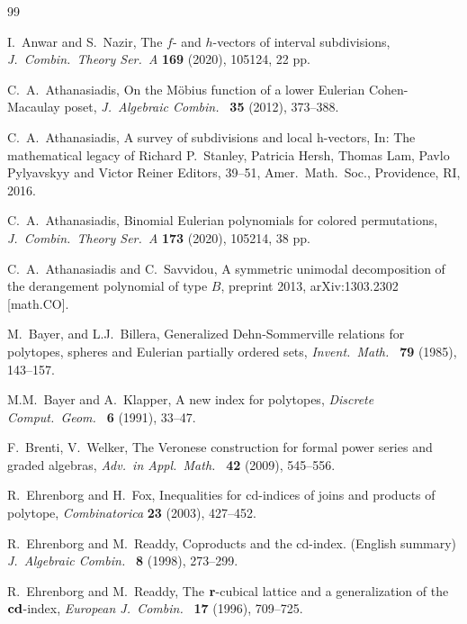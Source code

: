 \documentclass[reqno,12pt]{amsart}
\numberwithin{equation}{section}
\newcommand{\0}{\widehat{0}}
\newcommand{\1}{\widehat{1}}
\newcommand{\2}{\widehat{2}}
\begin{document}
\begin{thebibliography}{99}

I.\ Anwar and S.\ Nazir, 
The $f$- and $h$-vectors of interval subdivisions,
{\it J.\ Combin.\ Theory Ser.\ A } {\bf 169} (2020), 105124, 22 pp.   
  
C.\ A.\ Athanasiadis, 
On the M\"obius function of a lower Eulerian Cohen-Macaulay poset,
{\it J.\ Algebraic Combin.\ } {\bf 35} (2012), 373--388. 

C.\ A.\ Athanasiadis, 
A survey of subdivisions and local h-vectors, In: The mathematical
legacy of Richard P.\ Stanley, Patricia Hersh, Thomas Lam, Pavlo
Pylyavskyy and Victor Reiner Editors, 39--51, Amer.\ Math.\ Soc.,
Providence, RI, 2016.

C.\ A.\ Athanasiadis, 
Binomial Eulerian polynomials for colored permutations,
{\it J.\ Combin.\ Theory Ser.\ A} {\bf 173} (2020), 105214, 38 pp. 
  
  C.\ A.\ Athanasiadis and C.\ Savvidou,
A symmetric unimodal decomposition of the derangement polynomial of type
$B$, preprint 2013, arXiv:1303.2302 [math.CO].


  
M.\ Bayer, and L.J.\ Billera, 
Generalized Dehn-Sommerville relations for polytopes, spheres and
Eulerian partially ordered sets, 
{\it Invent.\ Math.\ } {\bf 79} (1985), 143--157. 

  
M.M.\ Bayer and A.\ Klapper, 
A new index for polytopes,
{\it Discrete Comput.\ Geom.\ } {\bf 6} (1991), 33--47.   

F.\ Brenti, V.\ Welker, 
The Veronese construction for formal power series and graded algebras,
{\it Adv.\ in Appl.\ Math.\ } {\bf 42} (2009), 545--556.   

  R.\ Ehrenborg and H.\ Fox,
Inequalities for cd-indices of joins and products of polytope, 
{\it Combinatorica} {\bf 23} (2003), 427--452.   

  R.\ Ehrenborg and M.\ Readdy,
Coproducts and the cd-index. (English summary)
{\it J.\ Algebraic Combin.\ } {\bf 8} (1998), 273--299. 

 R.\ Ehrenborg and M.\ Readdy,
The ${\bf r}$-cubical lattice and a generalization of the
${\bf cd}$-index, 
{\it European J.\ Combin.\ } {\bf 17} (1996), 709--725. 


\end{thebibliography}
\end{document}
